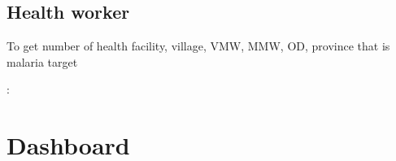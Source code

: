 \documentclass[letterpaper,10pt,english,openany,oneside]{sphinxmanual}
\begin{document}
\subsection{Health worker}
\label{\detokenize{api-cmi/v1:health-worker}}

\begin{fulllineitems}
\label{\detokenize{api-cmi/v1:get--api-malaria-info-v1-HF-hf_worker}}
\sphinxAtStartPar
To get number of health facility, village, VMW, MMW, OD, province that is malaria target

\sphinxAtStartPar
{}:

\begin{sphinxVerbatim}[commandchars=\\\{\}]
   
   
   \PYG{p}{[}
           
           
           
           
           
           
           
  \PYG{p}{]}
\end{sphinxVerbatim}

\end{fulllineitems}



\section{Dashboard}
\label{\detokenize{api-cmi/v1:dashboard}}
\end{document}
